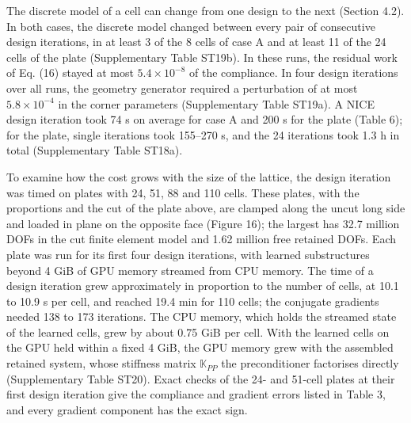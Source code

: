 \documentclass[preprint,12pt,authoryear]{elsarticle}
\begin{document}
The discrete model of a cell can change from one design to the next (Section 4.2). In both cases, the discrete model changed between every pair of consecutive design iterations, in at least 3 of the 8 cells of case A and at least 11 of the 24 cells of the plate (Supplementary Table ST19b). In these runs, the residual work of Eq. (16) stayed at most \(5.4\times10^{-8}\) of the compliance. In four design iterations over all runs, the geometry generator required a perturbation of at most \(5.8\times10^{-4}\) in the corner parameters (Supplementary Table ST19a). A NICE design iteration took 74 s on average for case A and 200 s for the plate (Table 6); for the plate, single iterations took 155--270 s, and the 24 iterations took 1.3 h in total (Supplementary Table ST18a).

To examine how the cost grows with the size of the lattice, the design iteration was timed on plates with 24, 51, 88 and 110 cells. These plates, with the proportions and the cut of the plate above, are clamped along the uncut long side and loaded in plane on the opposite face (Figure 16); the largest has 32.7 million DOFs in the cut finite element model and 1.62 million free retained DOFs. Each plate was run for its first four design iterations, with learned substructures beyond 4 GiB of GPU memory streamed from CPU memory. The time of a design iteration grew approximately in proportion to the number of cells, at 10.1 to 10.9 s per cell, and reached 19.4 min for 110 cells; the conjugate gradients needed 138 to 173 iterations. The CPU memory, which holds the streamed state of the learned cells, grew by about 0.75 GiB per cell. With the learned cells on the GPU held within a fixed 4 GiB, the GPU memory grew with the assembled retained system, whose stiffness matrix \(\mathbb K_{PP}\) the preconditioner factorises directly (Supplementary Table ST20). Exact checks of the 24- and 51-cell plates at their first design iteration give the compliance and gradient errors listed in Table 3, and every gradient component has the exact sign.
\end{document}
